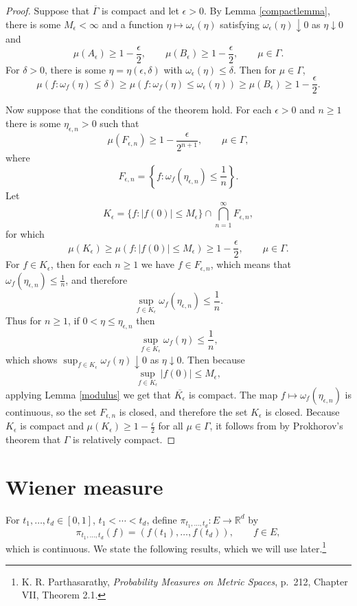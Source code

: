\documentclass{article}
\theoremstyle{definition}
\begin{document}
\begin{proof}
Suppose that $\overline{\Gamma}$ is compact and let $\epsilon>0$.
By Lemma \ref{compactlemma}, there is some $M_\epsilon<\infty$ and a function $\eta \mapsto \omega_\epsilon(\eta)$
satisfying $\omega_\epsilon(\eta) \downarrow 0$ as $\eta \downarrow 0$ and
\[
\mu(A_\epsilon) \geq 1-\frac{\epsilon}{2},\qquad \mu(B_\epsilon) \geq 1-\frac{\epsilon}{2},
\qquad \mu \in \Gamma.
\]
For $\delta>0$, there is some $\eta = \eta(\epsilon,\delta)$ with $\omega_\epsilon(\eta) \leq \delta$. Then for
$\mu \in \Gamma$,
\[
\mu(f : \omega_f(\eta) \leq \delta) \geq 
\mu(f : \omega_f(\eta) \leq \omega_\epsilon(\eta))
\geq \mu(B_\epsilon)
\geq 1-\frac{\epsilon}{2}.
\]

Now suppose that the conditions of the theorem hold. For  each $\epsilon>0$ and $n \geq 1$ there is some
$\eta_{\epsilon,n}>0$ such that 
\[
\mu(F_{\epsilon,n}) \geq 1-\frac{\epsilon}{2^{n+1}},\qquad \mu \in \Gamma,
\]
where
\[
F_{\epsilon,n} = \left\{f : \omega_f(\eta_{\epsilon,n}) \leq \frac{1}{n}\right\}.
\]
Let
\[
K_\epsilon = \{f : |f(0)| \leq M_\epsilon\} \cap \bigcap_{n=1}^\infty F_{\epsilon,n},
\]
for which
\[
\mu(K_\epsilon) \geq \mu(f : |f(0)| \leq M_\epsilon) \geq 1-\frac{\epsilon}{2},\qquad \mu \in \Gamma.
\]
For $f \in K_\epsilon$, then for each $n \geq 1$ we have $f \in F_{\epsilon,n}$, which means that
$\omega_f(\eta_{\epsilon,n}) \leq \frac{1}{n}$, and therefore
\[
\sup_{f \in K_\epsilon} \omega_f(\eta_{\epsilon,n}) \leq \frac{1}{n}.
\]
Thus for $n \geq 1$, if $0<\eta \leq \eta_{\epsilon,n}$ then
\[
\sup_{f \in K_\epsilon} \omega_f(\eta) \leq \frac{1}{n},
\]
which shows $\sup_{f \in K_\epsilon} \omega_f(\eta) \downarrow 0$ as $\eta \downarrow 0$. 
Then because
\[
\sup_{f \in K_\epsilon} |f(0)| \leq M_\epsilon,
\]
applying Lemma \ref{modulus} we get that $\overline{K_\epsilon}$ is compact. The map
$f \mapsto \omega_f(\eta_{\epsilon,n})$ is continuous, so the set $F_{\epsilon,n}$ is closed, and therefore
the set $K_\epsilon$ is closed.  
Because $K_\epsilon$ is compact and $\mu(K_\epsilon) \geq 1-\frac{\epsilon}{2}$ for all
$\mu \in \Gamma$, it follows from
by Prokhorov's theorem that  $\Gamma$ is relatively compact. 
\end{proof}



\section{Wiener measure}
For $t_1,\ldots,t_d \in [0,1]$, $t_1<\cdots<t_d$, 
define $\pi_{t_1,\ldots,t_d}:E \to \mathbb{R}^d$ by 
\[
\pi_{t_1,\ldots,t_d}(f) = (f(t_1),\ldots,f(t_d)),\qquad f \in E,
\]
which is continuous. We state the following results, which we will use later.\footnote{K. R.
Parthasarathy, {\em Probability Measures on Metric Spaces}, p.~212, Chapter VII, Theorem 2.1.}
\end{document}
